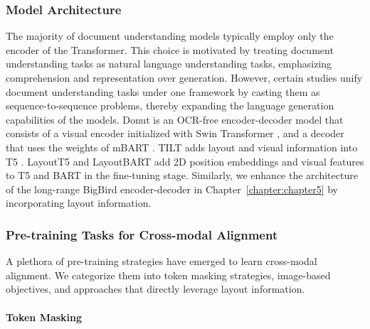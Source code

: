 \subsubsection{Model Architecture}

The majority of document understanding models typically employ only the encoder of the Transformer. This choice is motivated by treating document understanding tasks as natural language understanding tasks, emphasizing comprehension and representation over generation. However, certain studies unify document understanding tasks under one framework by casting them as sequence-to-sequence problems, thereby expanding the language generation capabilities of the models. Donut \citep{kim2022ocr} is an \ac{OCR}-free encoder-decoder model that consists of a visual encoder initialized with Swin Transformer \citep{liu2021swin}, and a decoder that uses the weights of mBART \citep{liu2020multilingual}. TILT \citep{powalski2021going} adds layout and visual information into \ac{T5} \citep{raffel2020exploring}. LayoutT5 and LayoutBART \citep{tanaka2021visualmrc} add 2D position embeddings and visual features to \ac{T5} and \ac{BART} \citep{lewis2019bart} in the fine-tuning stage. Similarly, we enhance the architecture of the long-range BigBird encoder-decoder \citep{zaheer2020big} in Chapter~\ref{chapter:chapter5} by incorporating layout information.

\subsubsection{Pre-training Tasks for Cross-modal Alignment}

A plethora of pre-training strategies have emerged to learn cross-modal alignment. We categorize them into token masking strategies, image-based objectives, and approaches that directly leverage layout information.

\paragraph{Token Masking}

